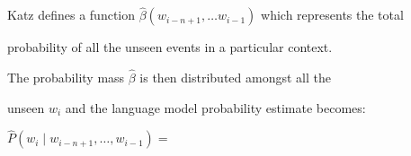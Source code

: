 Katz defines a function $\hat{\beta}(w_{i-n+1},


\ldots w_{i-1})$ which represents the total


probability of all the unseen events in a particular context. %
















The probability mass $\hat{\beta}$ is then distributed amongst all the


unseen $w_i$ and the language model probability estimate becomes:%


















%






\begin{equation}


\hat{P}(w_i \;|\; w_{i-n+1},\ldots,w_{i-1}) =\qquad{}\qquad{}\qquad{}\qquad{}\qquad{}\qquad{}\qquad{}\qquad{}\qquad{}\qquad{}\qquad{}\qquad{}\qquad{}\qquad{}\nonumber


\end{equation}


